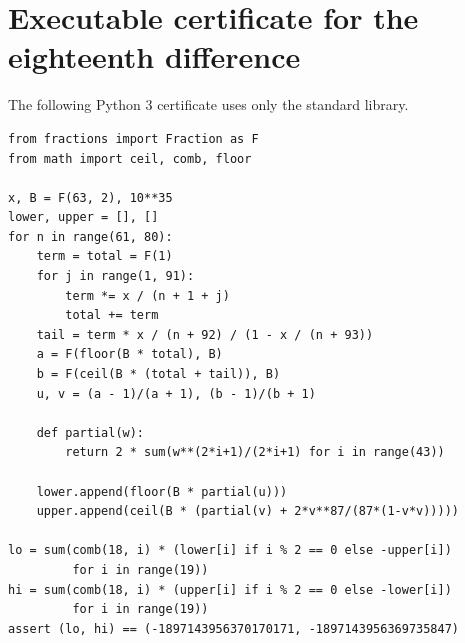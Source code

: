 \documentclass[11pt,a4paper]{article}
\begin{document}
\section{Executable certificate for the eighteenth difference}\label{app:exact}
\noindent The following Python 3 certificate uses only the standard library.
\begin{Verbatim}[fontsize=\small]
from fractions import Fraction as F
from math import ceil, comb, floor

x, B = F(63, 2), 10**35
lower, upper = [], []
for n in range(61, 80):
    term = total = F(1)
    for j in range(1, 91):
        term *= x / (n + 1 + j)
        total += term
    tail = term * x / (n + 92) / (1 - x / (n + 93))
    a = F(floor(B * total), B)
    b = F(ceil(B * (total + tail)), B)
    u, v = (a - 1)/(a + 1), (b - 1)/(b + 1)

    def partial(w):
        return 2 * sum(w**(2*i+1)/(2*i+1) for i in range(43))

    lower.append(floor(B * partial(u)))
    upper.append(ceil(B * (partial(v) + 2*v**87/(87*(1-v*v)))))

lo = sum(comb(18, i) * (lower[i] if i % 2 == 0 else -upper[i])
         for i in range(19))
hi = sum(comb(18, i) * (upper[i] if i % 2 == 0 else -lower[i])
         for i in range(19))
assert (lo, hi) == (-1897143956370170171, -1897143956369735847)
\end{Verbatim}
\end{document}
